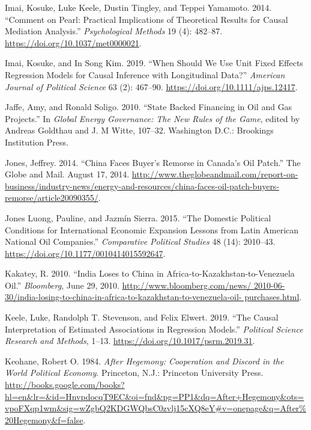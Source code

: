 \documentclass[11pt,]{book}
\begin{document}
\leavevmode\hypertarget{ref-imai_comment_2014-1}{}%
Imai, Kosuke, Luke Keele, Dustin Tingley, and Teppei Yamamoto. 2014. ``Comment on Pearl: Practical Implications of Theoretical Results for Causal Mediation Analysis.'' \emph{Psychological Methods} 19 (4): 482--87. \url{https://doi.org/10.1037/met0000021}.

\leavevmode\hypertarget{ref-imai_when_2019}{}%
Imai, Kosuke, and In Song Kim. 2019. ``When Should We Use Unit Fixed Effects Regression Models for Causal Inference with Longitudinal Data?'' \emph{American Journal of Political Science} 63 (2): 467--90. \url{https://doi.org/10.1111/ajps.12417}.

\leavevmode\hypertarget{ref-jaffe_state_2010}{}%
Jaffe, Amy, and Ronald Soligo. 2010. ``State Backed Financing in Oil and Gas Projects.'' In \emph{Global Energy Governance: The New Rules of the Game}, edited by Andreas Goldthau and J. M Witte, 107--32. Washington D.C.: Brookings Institution Press.

\leavevmode\hypertarget{ref-jones_china_2014}{}%
Jones, Jeffrey. 2014. ``China Faces Buyer's Remorse in Canada's Oil Patch.'' The Globe and Mail. August 17, 2014. \url{http://www.theglobeandmail.com/report-on-business/industry-news/energy-and-resources/china-faces-oil-patch-buyers-remorse/article20090355/}.

\leavevmode\hypertarget{ref-jones_luong_domestic_2015}{}%
Jones Luong, Pauline, and Jazmín Sierra. 2015. ``The Domestic Political Conditions for International Economic Expansion Lessons from Latin American National Oil Companies.'' \emph{Comparative Political Studies} 48 (14): 2010--43. \url{https://doi.org/10.1177/0010414015592647}.

\leavevmode\hypertarget{ref-kakatey_india_2010}{}%
Kakatey, R. 2010. ``India Loses to China in Africa-to-Kazakhstan-to-Venezuela Oil.'' \emph{Bloomberg}, June 29, 2010. \href{http://www.bloomberg.com/news/\%202010-06-30/india-losing-to-china-in-africa-to-kazakhstan-to-venezuela-oil-\%20purchases.html}{http://www.bloomberg.com/news/ 2010-06-30/india-losing-to-china-in-africa-to-kazakhstan-to-venezuela-oil- purchases.html}.

\leavevmode\hypertarget{ref-keele_causal_2019}{}%
Keele, Luke, Randolph T. Stevenson, and Felix Elwert. 2019. ``The Causal Interpretation of Estimated Associations in Regression Models.'' \emph{Political Science Research and Methods}, 1--13. \url{https://doi.org/10.1017/psrm.2019.31}.

\leavevmode\hypertarget{ref-keohane_after_1984}{}%
Keohane, Robert O. 1984. \emph{After Hegemony: Cooperation and Discord in the World Political Economy}. Princeton, N.J.: Princeton University Press. \url{http://books.google.com/books?hl=en\&lr=\&id=HnvpdocqT9EC\&oi=fnd\&pg=PP1\&dq=After+Hegemony\&ots=vpoFXqp1wm\&sig=wZgbQ2KDGWQbsC0zvlj15cXQ8eY\#v=onepage\&q=After\%20Hegemony\&f=false}.
\end{document}
